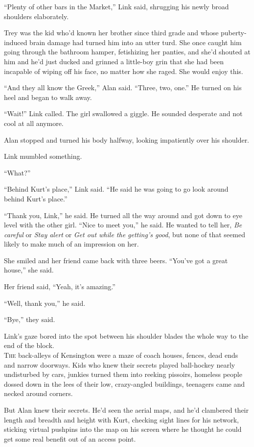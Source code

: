 \documentclass{article}
\begin{document}
``Plenty of other bars in the Market,'' Link said, shrugging his newly
broad shoulders elaborately.

Trey was the kid who'd known her brother since third grade and whose
puberty-induced brain damage had turned him into an utter turd.  She
once caught him going through the bathroom hamper, fetishizing her
panties, and she'd shouted at him and he'd just ducked and grinned a
little-boy grin that she had been incapable of wiping off his face, no
matter how she raged.  She would enjoy this.

``And they all know the Greek,'' Alan said.  ``Three, two, one.'' He
turned on his heel and began to walk away.

``Wait!'' Link called.  The girl swallowed a giggle.  He sounded
desperate and not cool at all anymore.

Alan stopped and turned his body halfway, looking impatiently over his
shoulder.

Link mumbled something.

``What?''

``Behind Kurt's place,'' Link said.  ``He said he was going to go look
around behind Kurt's place.''

``Thank you, Link,'' he said.  He turned all the way around and got
down to eye level with the other girl.  ``Nice to meet you,'' he said. 
He wanted to tell her, \textit{Be careful} or \textit{Stay alert} or
\textit{Get out while the getting's good}, but none of that seemed
likely to make much of an impression on her.

She smiled and her friend came back with three beers.  ``You've got a
great house,'' she said.

Her friend said, ``Yeah, it's amazing.''

``Well, thank you,'' he said.

``Bye,'' they said.

Link's gaze bored into the spot between his shoulder blades the whole
way to the end of the block.
\\
\lettrine[lines=3, lhang=.5, nindent=0pt, findent=2pt]{T}{he} back-alleys of Kensington were a maze of coach houses, fences,
dead ends and narrow doorways.  Kids who knew their secrets played
ball-hockey nearly undisturbed by cars, junkies turned them into
reeking pissoirs, homeless people dossed down in the lees of their
low, crazy-angled buildings, teenagers came and necked around corners.

But Alan knew their secrets.  He'd seen the aerial maps, and he'd
clambered their length and breadth and height with Kurt, checking
sight lines for his network, sticking virtual pushpins into the map on
his screen where he thought he could get some real benefit out of an
access point.
\end{document}
